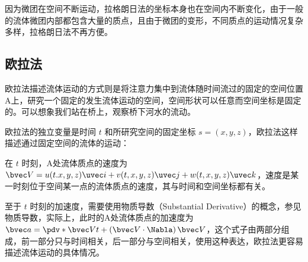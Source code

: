 因为微团在空间不断运动，拉格朗日法的坐标本身也在空间内不断变化，由于一般的流体微团内部都包含大量的质点，且由于微团的变形，不同质点的运动情况复杂多样，拉格朗日法不再方便。

\subsection{欧拉法}
欧拉法描述流体运动的方式则是将注意力集中到流体随时间流过的固定的空间位置A上，研究一个固定的发生流体运动的空间，空间形状可以任意而空间坐标是固定的。可以想象我们站在桥上，观察桥下河水的流动。

欧拉法的独立变量是时间 $t$ 和所研究空间的固定坐标 $s=(x,y,z)$，欧拉法这样描述通过固定空间的流体的运动：

在 $t$ 时刻，A处流体质点的速度为 $\bvec V=u(t.x,y,z)\uvec i+v(t,x,y,z)\uvec j+w(t,x,y,z)\uvec k$，速度是某一时刻位于空间某一点的流体质点的速度，其与时间和空间坐标都有关。

至于 $t$ 时刻的加速度，需要使用物质导数（Substantial  Derivative）的概念，参见物质导数，实际上，此时的A处流体质点的加速度为 $\bvec a=\pdv*{\bvec V}{t}+\left ( \bvec V\cdot \Nabla \right )\bvec V$，这个式子由两部分组成，前一部分只与时间相关，后一部分与空间相关，使用这种表达，欧拉法更容易描述流体运动的具体情况。
